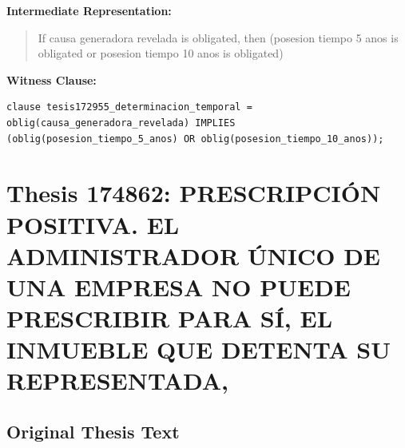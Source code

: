 \documentclass[11pt,a4paper]{article}
\begin{document}
\textbf{Intermediate Representation:}

\begin{quote}
If causa generadora revelada is obligated, then (posesion tiempo 5 anos is obligated or posesion tiempo 10 anos is obligated)
\end{quote}

\textbf{Witness Clause:}

\begin{lstlisting}[style=witnessstyle, language=Witness]
clause tesis172955_determinacion_temporal = oblig(causa_generadora_revelada) IMPLIES (oblig(posesion_tiempo_5_anos) OR oblig(posesion_tiempo_10_anos));
\end{lstlisting}

\newpage

\section{Thesis 174862: PRESCRIPCIÓN POSITIVA. EL ADMINISTRADOR ÚNICO DE UNA EMPRESA NO PUEDE PRESCRIBIR PARA SÍ, EL INMUEBLE QUE DETENTA SU REPRESENTADA,}
\label{thesis:174862}

\subsection{Original Thesis Text}
\end{document}
